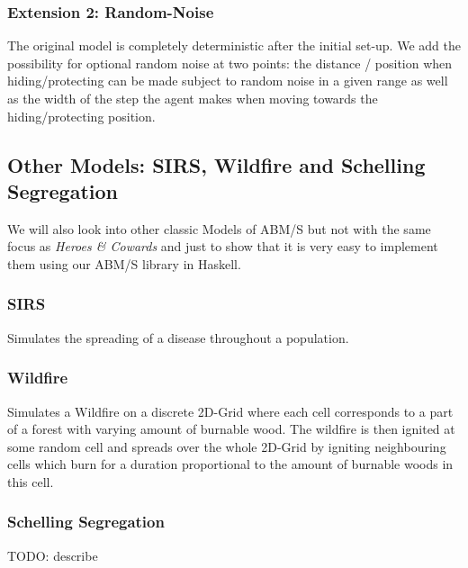 \subsubsection{Extension 2: Random-Noise}
The original model is completely deterministic after the initial set-up. We add the possibility for optional random noise at two points: the distance / position when hiding/protecting can be made subject to random noise in a given range as well as the width of the step the agent makes when moving towards the hiding/protecting position.

\subsection{Other Models: SIRS, Wildfire and Schelling Segregation}
We will also look into other classic Models of ABM/S but not with the same focus as \textit{Heroes \& Cowards} and just to show that it is very easy to implement them using our ABM/S library in Haskell.

\subsubsection{SIRS}
Simulates the spreading of a disease throughout a population.

\subsubsection{Wildfire}
Simulates a Wildfire on a discrete 2D-Grid where each cell corresponds to a part of a forest with varying amount of burnable wood. The wildfire is then ignited at some random cell and spreads over the whole 2D-Grid by igniting neighbouring cells which burn for a duration proportional to the amount of burnable woods in this cell.

\subsubsection{Schelling Segregation}
TODO: describe

